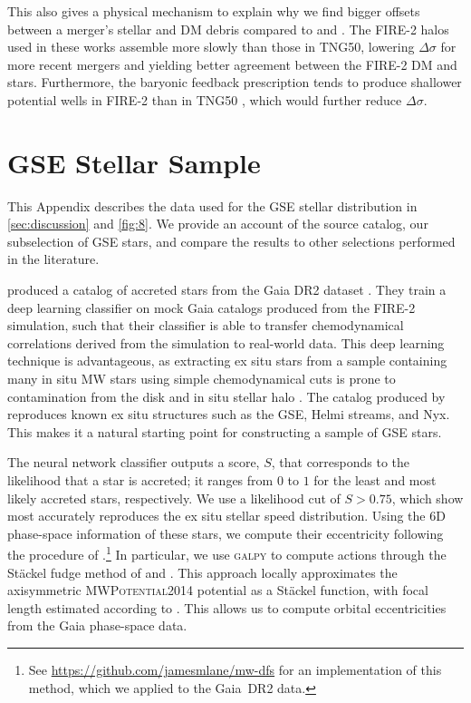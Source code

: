 \documentclass[twocolumn,tighten,twocolappendix]{aastex701}
\begin{document}
This also gives a physical mechanism to explain why we find bigger offsets between a merger's stellar and DM debris compared to \citet{2019ApJ...883...27N} and \citet{2026arXiv260325783Z}. The FIRE-2 halos used in these works assemble more slowly than those in TNG50, lowering $\Delta\sigma$ for more recent mergers and yielding better agreement between the FIRE-2 DM and stars. Furthermore, the baryonic feedback prescription tends to produce shallower potential wells in FIRE-2 than in TNG50 \citep[e.g.,][]{2025arXiv250114868H}, which would further reduce $\Delta\sigma$.


\section{GSE Stellar Sample} \label{appendix:gaia_GSE}

This Appendix describes the data used for the GSE stellar distribution in \autoref{sec:discussion} and \autoref{fig:8}. We provide an account of the source catalog, our subselection of GSE stars, and compare the  results to other selections performed in the literature.

\citet{2020A&A...636A..75O} produced a catalog of accreted stars from the Gaia DR2 dataset \citep{2018A&A...616A...1G}. They train a deep learning classifier on mock Gaia catalogs produced from the FIRE-2 simulation, such that their classifier is able to transfer chemodynamical correlations derived from the simulation to real-world data. This deep learning technique is advantageous, as extracting ex situ stars from a sample containing many in situ MW stars using simple chemodynamical cuts is prone to contamination from the disk and in situ stellar halo \citep{2022MNRAS.510.5119L,2024MNRAS.527.2165C,2024NewAR..9901706D}. The catalog produced by \citet{2020A&A...636A..75O} reproduces known ex situ structures such as the GSE, Helmi streams, and Nyx. This makes it a natural starting point for constructing a sample of GSE stars. 

The neural network classifier outputs a score, $S$, that corresponds to the likelihood that a star is accreted; it ranges from $0$ to $1$ for the least and most likely accreted stars, respectively. We use a likelihood cut of $S>0.75$, which \citet{2020A&A...636A..75O} show most accurately reproduces the ex situ stellar speed distribution. Using the 6D phase-space information of these stars, we compute their eccentricity following the procedure of \citet{2022MNRAS.510.5119L}.\footnote{See \url{https://github.com/jamesmlane/mw-dfs} for an implementation of this method, which we applied to the Gaia~DR2 data.} In particular, we use \textsc{galpy} \citep{2015ApJS..216...29B} to compute actions through the St\"ackel fudge method of \citet{2012MNRAS.426.1324B} and \citet{ 2018PASP..130k4501M}. This approach locally approximates the axisymmetric \textsc{MWPotential2014} potential \citep{2015ApJS..216...29B} as a St\"ackel function, with focal length estimated according to \citet{2012MNRAS.426..128S}. This allows us to compute orbital eccentricities from the Gaia phase-space data.
\end{document}

